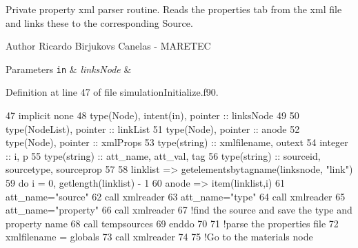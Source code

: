 Private property xml parser routine. Reads the properties tab from the xml file and links these to the corresponding Source. 

\begin{DoxyAuthor}{Author}
Ricardo Birjukovs Canelas -\/ M\+A\+R\+E\+T\+EC 
\end{DoxyAuthor}

\begin{DoxyParams}[1]{Parameters}
\mbox{\tt in}  & {\em links\+Node} & \\
\hline
\end{DoxyParams}


Definition at line 47 of file simulation\+Initialize.\+f90.


\begin{DoxyCode}
47     \textcolor{keywordtype}{implicit none}
48     \textcolor{keywordtype}{type}(Node), \textcolor{keywordtype}{intent(in)}, \textcolor{keywordtype}{pointer} :: linksNode
49 
50     \textcolor{keywordtype}{type}(NodeList), \textcolor{keywordtype}{pointer} :: linkList
51     \textcolor{keywordtype}{type}(Node), \textcolor{keywordtype}{pointer} :: anode
52     \textcolor{keywordtype}{type}(Node), \textcolor{keywordtype}{pointer} :: xmlProps
53     \textcolor{keywordtype}{type}(string) :: xmlfilename, outext
54     \textcolor{keywordtype}{integer} :: i, p
55     \textcolor{keywordtype}{type}(string) :: att\_name, att\_val, tag
56     \textcolor{keywordtype}{type}(string) :: sourceid, sourcetype, sourceprop
57 
58     linklist => getelementsbytagname(linksnode, \textcolor{stringliteral}{"link"})
59     \textcolor{keywordflow}{do} i = 0, getlength(linklist) - 1
60         anode => item(linklist,i)
61         att\_name=\textcolor{stringliteral}{"source"}
62         \textcolor{keyword}{call }xmlreader%
63         att\_name=\textcolor{stringliteral}{"type"}
64         \textcolor{keyword}{call }xmlreader%
65         att\_name=\textcolor{stringliteral}{"property"}
66         \textcolor{keyword}{call }xmlreader%
67         \textcolor{comment}{!find the source and save the type and property name}
68         \textcolor{keyword}{call }tempsources%
69 \textcolor{keywordflow}{    enddo}
70 
71     \textcolor{comment}{!parse the properties file}
72     xmlfilename = globals%
73     \textcolor{keyword}{call }xmlreader%
74 
75     \textcolor{comment}{!Go to the materials node}

\end{DoxyCode}
